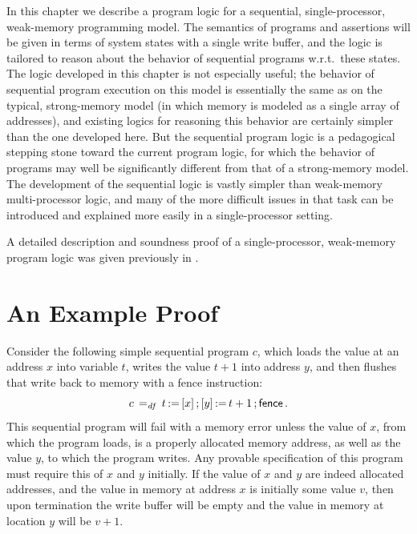 \documentclass[11pt]{report}
\begin{document}
In this chapter we describe a program logic for a sequential, single-processor, weak-memory programming model. The semantics of programs and assertions will be given in terms of system states with a single write buffer, and the logic is tailored to reason about the behavior of sequential programs w.r.t.\ these states. The logic developed in this chapter is not especially useful; the behavior of sequential program execution on this model is essentially the same as on the typical, strong-memory model (in which memory is modeled as a single array of addresses), and existing logics for reasoning this behavior are certainly simpler than the one developed here. But the sequential program logic is a pedagogical stepping stone toward the current program logic, for which the behavior of programs may well be significantly different from that of a strong-memory model. The development of the sequential logic is vastly simpler than weak-memory multi-processor logic, and many of the more difficult issues in that task can be introduced and explained more easily in a single-processor setting. 

A detailed description and soundness proof of a single-processor, weak-memory program logic was given previously in \cite{wmsldetails}. 

\section{An Example Proof}

Consider the following simple sequential program $c$, which loads the value at an address $x$ into variable $t$, writes the value $t+1$ into address $y$, and then flushes that write back to memory with a fence instruction: \[ c \operatorname{\;=_{\mathit{df}}\;} t \operatorname{:\!=} \left[ x \right] \operatorname{;} \left[ y \right] \operatorname{:\!=} t+1 \operatorname{;} \operatorname{\mathsf{fence}}.\] This sequential program will fail with a memory error unless the value of $x$, from which the program loads, is a properly allocated memory address, as well as the value $y$, to which the program writes. Any provable specification of this program must require this of $x$ and $y$ initially. If the value of $x$ and $y$ are indeed allocated addresses, and the value in memory at address $x$ is initially some value $v$, then upon termination the write buffer will be empty and the value in memory at location $y$ will be $v+1$. 
\end{document}
